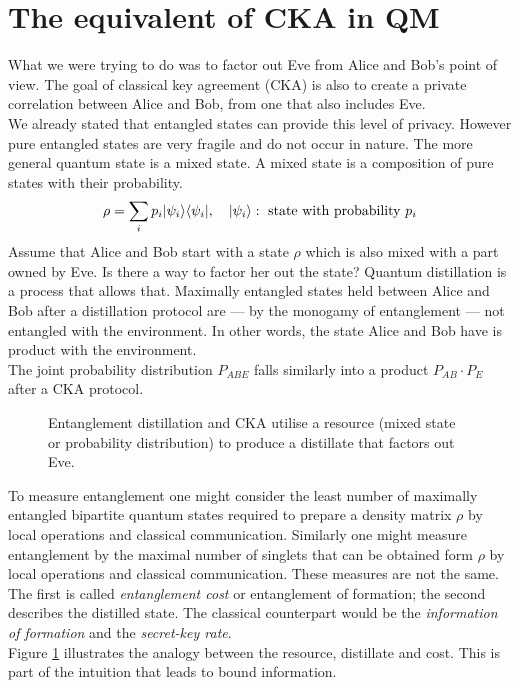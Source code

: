 	
    
\section{The equivalent of CKA in QM}
	What we were trying to do was to factor out Eve from Alice and Bob's point of view.
	The goal of classical key agreement (CKA) is also to create a private correlation between Alice and Bob, from one that also includes Eve.\\
	We already stated that entangled states can provide this level of privacy.
	However pure entangled states are very fragile and do not occur in nature.
	The more general quantum state is a mixed state.
	A mixed state is a composition of pure states with their probability.
	\begin{equation}
		\rho = \sum_i p_i |\psi_i \rangle\langle \psi_i| ,\quad |\psi_i \rangle: \text{ state with probability } p_i
	\end{equation}
	Assume that Alice and Bob start with a state $\rho$ which is also mixed with a part owned by Eve. 
	Is there a way to factor her out the state?
	Quantum distillation is a process that allows that. 
	Maximally entangled states held between Alice and Bob after a distillation protocol are --- by the monogamy of entanglement --- not entangled with the environment. 
	In other words, the state Alice and Bob have is product with the environment.\\
	The joint probability distribution $P_{ABE}$ falls similarly into a product $P_{AB}\cdot P_E$ after a CKA protocol.\\
    
    \begin{figure}[h]
    	\centering
    	
    	\caption{Entanglement distillation and CKA utilise a resource (mixed state or probability distribution) to produce a distillate that factors out Eve.}
    	\label{Fig:intuition}
    \end{figure}
    
    To measure entanglement one might consider the least number of maximally entangled bipartite quantum states required to prepare a density matrix $\rho$ by local operations and classical communication. 
    Similarly one might measure entanglement by the maximal number of singlets that can be obtained form $\rho$ by local operations and classical communication. 
    These measures are not the same. 
    The first is called \emph{entanglement cost} or entanglement of formation; the second describes the distilled state. 
    The classical counterpart would be the \emph{information of formation} and the \emph{secret-key rate}.\\
    Figure \ref{Fig:intuition} illustrates the analogy between the resource, distillate and cost.
    This is part of the intuition that leads to bound information.
    
    
